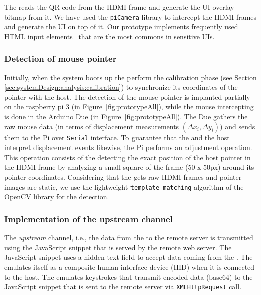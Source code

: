 The \device reads the QR code from the HDMI frame and generate the UI overlay bitmap from it. We have used the \texttt{piCamera} library to intercept the HDMI frames and generate the UI on top of it. Our \name prototype implements frequently used HTML input elements~\cite{html_elements} that are the most commons in sensitive UIs. 

\subsubsection{\bfseries Detection of mouse pointer}
\label{sec:prototype:impl:mouse}

Initially, when the system boots up the \device perform the calibration phase (see Section \ref{sec:systemDesign:analysis:calibration}) to synchronize its coordinates of the pointer with the host. The detection of the mouse pointer is implanted partially on the raspberry pi 3 (\six in Figure~\ref{fig:prototypeAll}), while the mouse intercepting is done in the Arduino Due (\three in Figure~\ref{fig:prototypeAll}). The Due gathers the raw mouse data (in terms of displacement measurements $(\Delta x_i, \Delta y_i)$) and sends them to the Pi over \texttt{Serial} interface.  To guarantee that the \device and the host interpret displacement events likewise, the Pi performs an adjustment operation. This operation consists of the \device detecting the exact position of the host pointer in the HDMI frame by analyzing a small square of the frame (50 x 50px) around its pointer coordinates. Considering that the \device gets raw HDMI frames and pointer images are static, we use the lightweight \texttt{template matching} algorithm of the OpenCV library for the detection.

\subsubsection{\bfseries Implementation of the upstream channel}
\label{sec:prototype:impl:upstream}

 The \emph{upstream} channel, i.e., the data from the \device to the remote server is transmitted using the \name JavaScript snippet that is served by the remote web server. The \name JavaScript snippet uses a hidden text field to accept data coming from the \device. The \device emulates itself as a composite human interface device (HID) when it is connected to the host. The \device emulates keystrokes that transmit encoded data (base64) to the \name JavaScript snippet that is sent to the remote server via \texttt{XMLHttpRequest} call.

